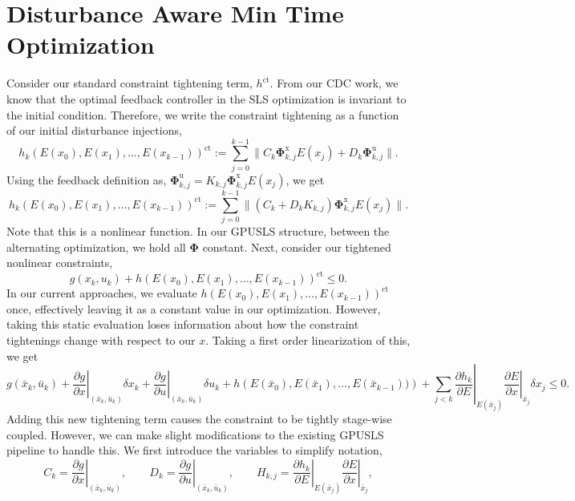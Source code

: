 \documentclass{article}
\begin{document}
\section{Disturbance Aware Min Time Optimization}
Consider our standard constraint tightening term, $h^{\text{ct}}$. From our CDC work, we know that the optimal feedback controller in the SLS optimization is invariant to the initial condition. Therefore, we write the constraint tightening as a function of our initial disturbance injections,
\begin{equation}
    h_k(E(x_0), E(x_1),\ldots, E(x_{k-1}))^\text{ct} := \sum_{j=0}^{k-1} \| C_k \mathbf \Phi^\text{x}_{k,j} E(x_j) + D_k \mathbf \Phi^\text{u}_{k,j}\|.
\end{equation}
Using the feedback definition as, $\mathbf \Phi^\text{u}_{k,j} = K_{k,j} \mathbf \Phi^\text{x}_{k,j} E(x_j)$, we get
\begin{equation}
    h_k(E(x_0), E(x_1),\ldots, E(x_{k-1}))^\text{ct} := \sum_{j=0}^{k-1} \| (C_k + D_k K_{k,j})\mathbf \Phi^\text{x}_{k,j} E(x_j) \|.
\end{equation}
Note that this is a nonlinear function. In our GPUSLS structure, between the alternating optimization, we hold all $\mathbf \Phi$ constant. Next, consider our tightened nonlinear constraints,
\begin{equation}
    g(x_k, u_k) + h(E(x_0), E(x_1),\ldots, E(x_{k-1}))^\text{ct} \leq 0.
\end{equation}
In our current approaches, we evaluate $h(E(x_0), E(x_1),\ldots, E(x_{k-1}))^\text{ct}$ once, effectively leaving it as a constant value in our optimization. However, taking this static evaluation loses information about how the constraint tightenings change with respect to our $x$. Taking a first order linearization of this, we get
\begin{equation}
g(\bar{x}_k,\bar{u}_k) +
\left.\frac{\partial g}{\partial x}\right|_{(\bar{x}_k,\bar{u}_k)}
\delta x_k
+
\left.\frac{\partial g}{\partial u}\right|_{(\bar{x}_k,\bar{u}_k)}
\delta u_k +
h\!\left(E(\bar x_0), E(\bar x_1),\ldots, E(\bar x_{k-1}))\right)
+
\left.
\sum_{j < k}
\frac{\partial h_k}{\partial E}
\right|_{E(\bar{x}_j)}
\left.
\frac{\partial E}{\partial x}
\right|_{\bar{x}_j}
\delta x_j
\le 0.
\end{equation}
Adding this new tightening term causes the constraint to be tightly stage-wise coupled. However, we can make slight modifications to the existing GPUSLS pipeline to handle this. We first introduce the variables to simplify notation,
\begin{equation}
    C_k = \left.\frac{\partial g}{\partial x}\right|_{(\bar{x}_k,\bar{u}_k)},
    \qquad
    D_k = \left.\frac{\partial g}{\partial u}\right|_{(\bar{x}_k,\bar{u}_k)},
    \qquad
    H_{k,j} = \left. \frac{\partial h_k}{\partial E}
    \right|_{E(\bar{x}_j)}
    \left.
    \frac{\partial E}{\partial x}
    \right|_{\bar{x}_j},
\end{equation}
\end{document}
